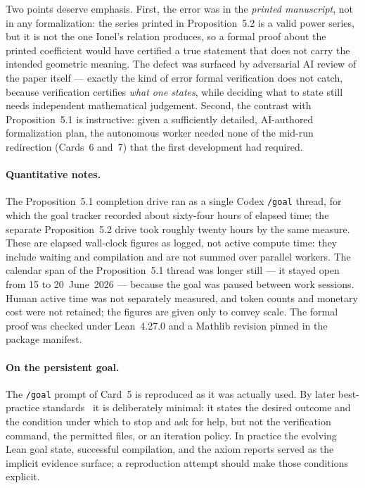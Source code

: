 \documentclass[11pt]{article}
\theoremstyle{definition}
\theoremstyle{remark}
\begin{document}
Two points deserve emphasis.  First, the error was in the \emph{printed
manuscript}, not in any formalization: the series printed in Proposition~5.2 is a
valid power series, but it is not the one Ionel's relation produces, so a formal
proof about the printed coefficient would have certified a true statement that
does not carry the intended geometric meaning.  The defect was surfaced by
adversarial AI review of the paper itself --- exactly the kind of error formal
verification does not catch, because verification certifies \emph{what one
states}, while deciding what to state still needs independent mathematical
judgement.  Second, the contrast with Proposition~5.1 is instructive: given a
sufficiently detailed, AI-authored formalization plan, the autonomous worker
needed none of the mid-run redirection (Cards~6 and~7) that the first development
had required.

\paragraph{Quantitative notes.}
The Proposition~5.1 completion drive ran as a single Codex \texttt{/goal} thread,
for which the goal tracker recorded about sixty-four hours of elapsed time; the
separate Proposition~5.2 drive took roughly twenty hours by the same measure.
These are elapsed wall-clock figures as logged, not active compute time: they
include waiting and compilation and are not summed over parallel workers.  The
calendar span of the Proposition~5.1 thread was longer still --- it stayed open
from 15 to 20~June~2026 --- because the goal was paused between work sessions.
Human active time was not separately measured, and token counts and monetary
cost were not retained; the figures are given only to convey scale.  The formal
proof was checked under Lean~4.27.0 and a Mathlib revision pinned in the package
manifest.

\paragraph{On the persistent goal.}
The \texttt{/goal} prompt of Card~5 is reproduced as it was actually used.  By
later best-practice standards~\cite{OpenAIGoals} it is deliberately minimal: it
states the desired outcome and the condition under which to stop and ask for
help, but not the verification command, the permitted files, or an iteration
policy.  In practice the evolving Lean goal state, successful compilation, and
the axiom reports served as the implicit evidence surface; a reproduction attempt
should make those conditions explicit.
\end{document}
